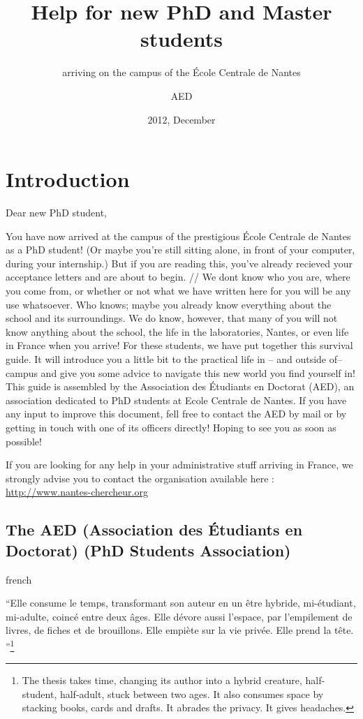 \documentclass[12pt, english, squeezeCommittee, fancyChapter, fancyPart]{these-LUNAM}
\title{Help for new PhD and Master students}
\subtitle{arriving on the campus of the \'Ecole Centrale de Nantes}
\author{AED}{PhD Students Association}{(AED)}
\date{2012, December}
\begin{document}
\maketitle

\tableofcontents

\frontmatter
\chapter*{Introduction}
Dear new PhD student,

You have now arrived at the campus of the prestigious École Centrale de Nantes as a PhD student! (Or maybe you're still sitting alone, in front of your computer, during your internship.)
But if you are reading this, you've already recieved your acceptance letters and are about to begin. //
We dont know who you are, where you come from, or whether or not what we have written here for you will be any use whatsoever. Who knows; maybe you already know everything about the school and its surroundings. We do know, however, that many of you will not know anything about the school, the life in the laboratories, Nantes, or even life in France when you arrive! For these students, we have put together this survival guide. It will introduce  you a little bit to the practical life in -- and outside of-- campus and give you some advice to navigate this new world you find yourself in! This guide is assembled by the Association des Étudiants en Doctorat (AED), an association dedicated to PhD students at Ecole Centrale de Nantes. If you have any input to improve this document, fell free to contact the AED by mail or by getting in touch with one of its officers directly!
Hoping to see you as soon as possible!


If you are looking for any help in your administrative stuff arriving in France, we strongly advise you to contact the organisation available here :\\
\url{http://www.nantes-chercheur.org}

\section*{The AED (Association des Étudiants en Doctorat) (PhD Students Association)}
\begin{foreigndisplayquote}{french}
\begin{small}
``Elle consume le temps, transformant son auteur en un être hybride, mi-étudiant, mi-adulte, coincé entre deux âges.
Elle dévore aussi l’espace, par l’empilement de livres, de fiches et de brouillons. Elle empiète sur la vie privée. Elle prend la tête.
''\footnote{The thesis takes time, changing its author into a hybrid creature, half-student, half-adult, stuck between two ages.
It also consumes space by stacking books, cards and drafts. It abrades the privacy. It gives headaches.}
\end{small}
\end{foreigndisplayquote}
\end{document}
